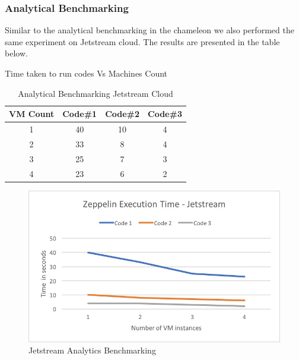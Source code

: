 \documentclass[9pt,twocolumn,twoside]{../../styles/osajnl}
\begin{document}
	\subsubsection{Analytical Benchmarking}
	
	Similar to the analytical benchmarking in the chameleon we also 
	performed the same experiment on Jetstream cloud. The results are 
	presented in the table below.
	
	\begin{table}[ht]
		\caption{Analytical Benchmarking Jetstream Cloud} %
		\centering %
		Time taken to run codes Vs Machines Count \\
		\begin{tabular}{c c c c} %
			\hline
			\hline %
			VM Count & Code\#1 & Code\#2 & Code\#3 \\ [0.5ex] %
			\hline %
			1 & 40 & 10 & 4 \\ %
			2 & 33 & 8 & 4 \\
			3 & 25 & 7 & 3 \\
			4 & 23 & 6 & 2 \\ [1ex] %
			\hline %
		\end{tabular}
		\label{table:nonlin} %
	\end{table}
	
	\begin{figure}
		\includegraphics[width=\linewidth]{./images/Jetstream_analytic_benchmark}
		\caption{Jetstream Analytics Benchmarking}
		\label{fig:Jetstream Analytics Benchmarking}
	\end{figure}
\end{document}
